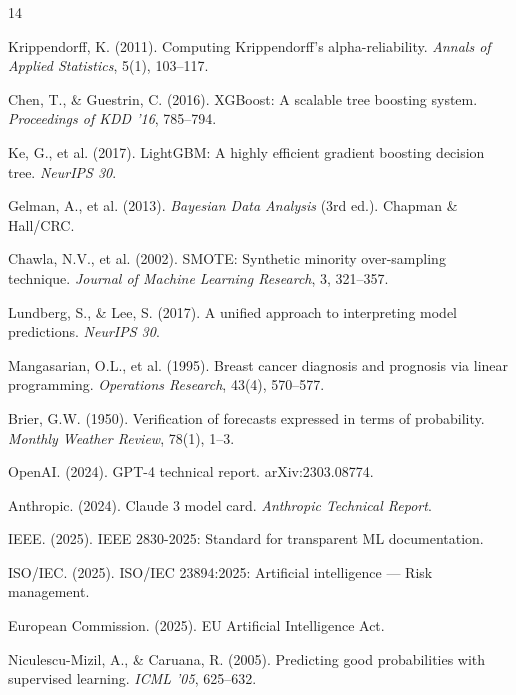 \documentclass[11pt,a4paper]{article}
\begin{document}
\begin{thebibliography}{14}

Krippendorff, K. (2011).
\newblock Computing Krippendorff's alpha-reliability.
\newblock \textit{Annals of Applied Statistics}, 5(1), 103--117.

Chen, T., \& Guestrin, C. (2016).
\newblock XGBoost: A scalable tree boosting system.
\newblock \textit{Proceedings of KDD '16}, 785--794.

Ke, G., et al. (2017).
\newblock LightGBM: A highly efficient gradient boosting decision tree.
\newblock \textit{NeurIPS 30}.

Gelman, A., et al. (2013).
\newblock \textit{Bayesian Data Analysis} (3rd ed.).
\newblock Chapman \& Hall/CRC.

Chawla, N.V., et al. (2002).
\newblock SMOTE: Synthetic minority over-sampling technique.
\newblock \textit{Journal of Machine Learning Research}, 3, 321--357.

Lundberg, S., \& Lee, S. (2017).
\newblock A unified approach to interpreting model predictions.
\newblock \textit{NeurIPS 30}.

Mangasarian, O.L., et al. (1995).
\newblock Breast cancer diagnosis and prognosis via linear programming.
\newblock \textit{Operations Research}, 43(4), 570--577.

Brier, G.W. (1950).
\newblock Verification of forecasts expressed in terms of probability.
\newblock \textit{Monthly Weather Review}, 78(1), 1--3.

OpenAI. (2024).
\newblock GPT-4 technical report.
\newblock arXiv:2303.08774.

Anthropic. (2024).
\newblock Claude 3 model card.
\newblock \textit{Anthropic Technical Report}.

IEEE. (2025).
\newblock IEEE 2830-2025: Standard for transparent ML documentation.

ISO/IEC. (2025).
\newblock ISO/IEC 23894:2025: Artificial intelligence --- Risk management.

European Commission. (2025).
\newblock EU Artificial Intelligence Act.

Niculescu-Mizil, A., \& Caruana, R. (2005).
\newblock Predicting good probabilities with supervised learning.
\newblock \textit{ICML '05}, 625--632.

\end{thebibliography}
\end{document}
